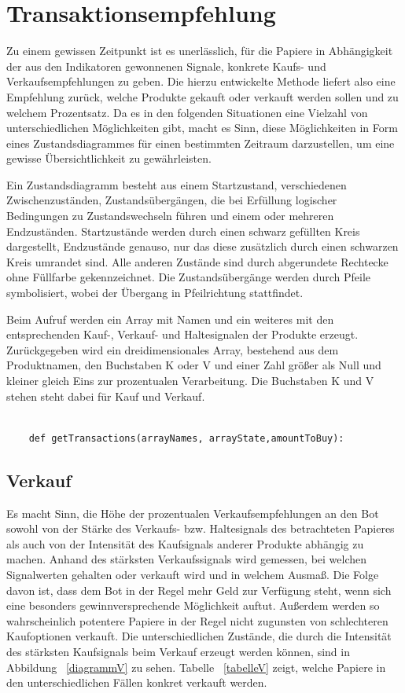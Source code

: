 \section{Transaktionsempfehlung}

Zu einem gewissen Zeitpunkt ist es unerlässlich, für die Papiere in Abhängigkeit der aus den Indikatoren gewonnenen Signale, konkrete Kaufs- und Verkaufsempfehlungen zu geben. Die hierzu entwickelte Methode liefert also eine Empfehlung zurück, welche Produkte gekauft oder verkauft werden sollen und zu welchem Prozentsatz. Da es in den folgenden Situationen eine Vielzahl von unterschiedlichen Möglichkeiten gibt, macht es Sinn, diese Möglichkeiten in Form eines Zustandsdiagrammes für einen bestimmten Zeitraum darzustellen, um eine gewisse Übersichtlichkeit zu gewährleisten.\cite{ZDiagramm}

Ein Zustandsdiagramm besteht aus einem Startzustand, verschiedenen Zwischenzuständen, Zustandsübergängen, die bei Erfüllung logischer Bedingungen zu Zustandswechseln führen und einem oder mehreren Endzuständen. Startzustände werden durch einen schwarz gefüllten Kreis dargestellt, Endzustände genauso, nur das diese zusätzlich durch einen schwarzen Kreis umrandet sind. Alle anderen Zustände sind durch abgerundete Rechtecke ohne Füllfarbe gekennzeichnet. Die Zustandsübergänge werden durch Pfeile symbolisiert, wobei der Übergang in Pfeilrichtung stattfindet.\cite{ZDiagramm}

Beim Aufruf werden ein Array mit Namen und  ein weiteres mit den entsprechenden Kauf-, Verkauf- und Haltesignalen der Produkte erzeugt. Zurückgegeben wird ein dreidimensionales Array, bestehend aus dem Produktnamen, den Buchstaben K oder V und einer Zahl größer als Null und kleiner gleich Eins zur prozentualen Verarbeitung. Die Buchstaben K und V stehen steht dabei für Kauf und Verkauf.             
\begin{lstlisting}[breakatwhitespace=false, breaklines=true]

	def getTransactions(arrayNames, arrayState,amountToBuy):

\end{lstlisting}
\subsection{Verkauf}
Es macht Sinn, die Höhe der prozentualen Verkaufsempfehlungen an den Bot sowohl von der Stärke des Verkaufs- bzw. Haltesignals des betrachteten Papieres als auch von der Intensität des Kaufsignals anderer Produkte abhängig zu machen. Anhand des stärksten Verkaufssignals wird gemessen, bei welchen Signalwerten gehalten oder verkauft wird und in welchem Ausmaß. Die Folge davon ist, dass dem Bot in der Regel mehr Geld zur Verfügung steht, wenn sich eine besonders gewinnversprechende Möglichkeit auftut. Außerdem werden so wahrscheinlich potentere Papiere in der Regel nicht zugunsten von schlechteren Kaufoptionen verkauft. Die unterschiedlichen Zustände, die durch die Intensität des stärksten Kaufsignals beim Verkauf erzeugt werden können, sind in Abbildung ~\ref{diagrammV} zu sehen. Tabelle ~\ref{tabelleV} zeigt, welche Papiere in den unterschiedlichen Fällen konkret verkauft werden.

